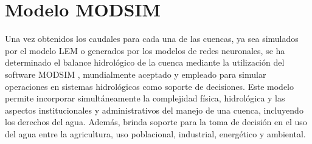 
  



\section{Modelo MODSIM}
\label{Modelo_balance}

Una vez obtenidos los caudales para cada una de las cuencas, ya sea simulados por el modelo LEM o generados por 
los modelos de redes neuronales, se ha determinado el balance hidrológico de la cuenca mediante la utilización 
del software MODSIM \cite{modsim}, mundialmente aceptado y  empleado para simular operaciones en sistemas 
hidrológicos como soporte de decisiones. Este modelo permite incorporar simultáneamente la complejidad física, 
hidrológica y las aspectos institucionales y administrativos del manejo de una cuenca, incluyendo los derechos 
del agua. Además, brinda soporte para la toma de decisión en el uso del agua entre la agricultura, uso poblacional,
 industrial, energético y ambiental.


